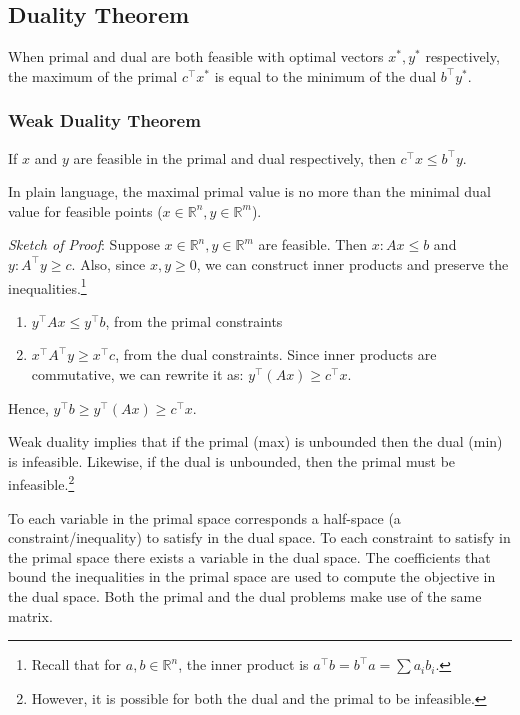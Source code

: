 \documentclass[11pt,]{article}
\providecommand{\tightlist}{%
  \setlength{\itemsep}{0pt}\setlength{\parskip}{0pt}}
\let\rmarkdownfootnote\footnote%
\def\footnote{\protect\rmarkdownfootnote}
\begin{document}
\subsection{Duality Theorem}\label{duality-theorem}

When primal and dual are both feasible with optimal vectors \(x^*, y^*\)
respectively, the maximum of the primal \(c^{\top}x^*\) is equal to the
minimum of the dual \(b^{\top}y^*\).

\subsubsection{Weak Duality Theorem}\label{weak-duality-theorem}

If \(x\) and \(y\) are feasible in the primal and dual respectively,
then \(c^{\top}x\leq b^{\top}y\).

In plain language, the maximal primal value is no more than the minimal
dual value for feasible points
(\(x\in \mathbb{R}^n, y\in \mathbb{R}^m\)).

\emph{Sketch of Proof}: Suppose \(x\in \mathbb{R}^n, y\in \mathbb{R}^m\)
are feasible. Then \(x:Ax\leq b\) and \(y:A^{\top}y\geq c\). Also, since
\(x, y \geq 0\), we can construct inner products and preserve the
inequalities.\footnote{Recall that for \(a,b\in \mathbb{R}^n\), the
  inner product is \(a^{\top}b=b^{\top}a=\sum a_ib_i\).}

\begin{enumerate}
\def\labelenumi{\arabic{enumi}.}
\tightlist
\item
  \(y^{\top}Ax \leq y^{\top}b\), from the primal constraints
\item
  \(x^{\top}A^{\top}y \geq x^{\top}c\), from the dual constraints. Since
  inner products are commutative, we can rewrite it as:
  \(y^{\top}(Ax) \geq c^{\top}x\).
\end{enumerate}

Hence, \(y^{\top}b\geq y^{\top}(Ax)\geq c^{\top}x\).

Weak duality implies that if the primal (max) is unbounded then the dual
(min) is infeasible. Likewise, if the dual is unbounded, then the primal
must be infeasible.\footnote{However, it is possible for both the dual
  and the primal to be infeasible.}

To each variable in the primal space corresponds a half-space (a
constraint/inequality) to satisfy in the dual space. To each constraint
to satisfy in the primal space there exists a variable in the dual
space. The coefficients that bound the inequalities in the primal space
are used to compute the objective in the dual space. Both the primal and
the dual problems make use of the same matrix.
\end{document}
